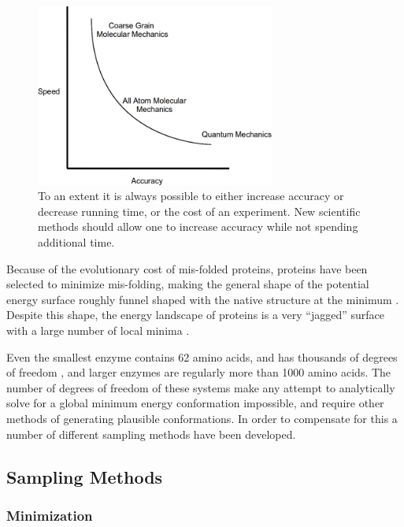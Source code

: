 \begin{figure}[h]
\begin{center}
\includegraphics[width=0.7\textwidth]{figures/conservation_of_annoyance.png}
\caption{To an extent it is always possible to either increase accuracy or decrease running time, or the cost of an experiment.
New scientific methods should allow one to increase accuracy while not spending additional time.}
\label{figure:conservation_of_annoyance}
\end{center}
\end{figure}

Because of the evolutionary cost of mis-folded proteins, proteins have been selected to minimize mis-folding, making the general shape of the potential energy surface roughly funnel shaped with the native structure at the minimum \cite{leopold1992protein}.
Despite this shape, the energy landscape of proteins is a very ``jagged'' surface with a large number of local minima \cite{tsai1999folding}.

Even the smallest enzyme contains 62 amino acids, and has thousands of degrees of freedom \cite{chen19924}, and larger enzymes are regularly more than 1000 amino acids.
The number of degrees of freedom of these systems make any attempt to analytically solve for a global minimum energy conformation impossible, and require other methods of generating plausible conformations.
In order to compensate for this a number of different sampling methods have been developed.

\subsection{Sampling Methods}
\label{subsection:sampling_methods}

\subsubsection{Minimization}
\label{subsubsection:minimization}


